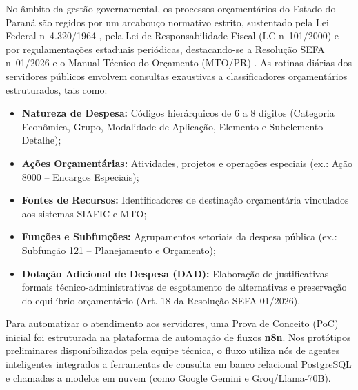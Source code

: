 \documentclass[11pt]{article}
\begin{document}
No âmbito da gestão governamental, os processos orçamentários do Estado do Paraná são regidos por um arcabouço normativo estrito, sustentado pela Lei Federal n\textordmasculine~4.320/1964 \citep{lei_4320_1964}, pela Lei de Responsabilidade Fiscal (LC n\textordmasculine~101/2000) e por regulamentações estaduais periódicas, destacando-se a Resolução SEFA n\textordmasculine~01/2026 \citep{resolucao_sefa_01_2026} e o Manual Técnico do Orçamento (MTO/PR) \citep{mto_pr_2026}. As rotinas diárias dos servidores públicos envolvem consultas exaustivas a classificadores orçamentários estruturados, tais como:
\begin{itemize}
    \item \textbf{Natureza de Despesa:} Códigos hierárquicos de 6 a 8 dígitos (Categoria Econômica, Grupo, Modalidade de Aplicação, Elemento e Subelemento Detalhe);
    \item \textbf{Ações Orçamentárias:} Atividades, projetos e operações especiais (ex.: Ação 8000 -- Encargos Especiais);
    \item \textbf{Fontes de Recursos:} Identificadores de destinação orçamentária vinculados aos sistemas SIAFIC e MTO;
    \item \textbf{Funções e Subfunções:} Agrupamentos setoriais da despesa pública (ex.: Subfunção 121 -- Planejamento e Orçamento);
    \item \textbf{Dotação Adicional de Despesa (DAD):} Elaboração de justificativas formais técnico-administrativas de esgotamento de alternativas e preservação do equilíbrio orçamentário (Art. 18 da Resolução SEFA 01/2026).
\end{itemize}

Para automatizar o atendimento aos servidores, uma Prova de Conceito (PoC) inicial foi estruturada na plataforma de automação de fluxos \textbf{n8n}. Nos protótipos preliminares disponibilizados pela equipe técnica, o fluxo utiliza nós de agentes inteligentes integrados a ferramentas de consulta em banco relacional PostgreSQL e chamadas a modelos em nuvem (como Google Gemini e Groq/Llama-70B).
\end{document}
